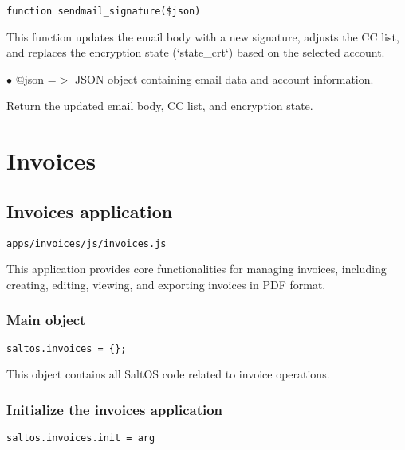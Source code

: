 \documentclass[a4paper]{article}
\begin{document}
\begin{lstlisting}
function sendmail_signature($json)
\end{lstlisting}

This function updates the email body with a new signature, adjusts the CC list,
and replaces the encryption state (`state\_crt`) based on the selected account.

\begin{compactitem}
\item[\color{myblue}$\bullet$] @json =$>$ JSON object containing email data and account information.
\end{compactitem}

Return the updated email body, CC list, and encryption state.


\hypertarget{toc139}{}
\section{Invoices}

\hypertarget{toc140}{}
\subsection{Invoices application}

\begin{lstlisting}
apps/invoices/js/invoices.js
\end{lstlisting}

This application provides core functionalities for managing invoices, including creating,
editing, viewing, and exporting invoices in PDF format.

\hypertarget{toc141}{}
\subsubsection{Main object}

\begin{lstlisting}
saltos.invoices = {};
\end{lstlisting}

This object contains all SaltOS code related to invoice operations.

\hypertarget{toc142}{}
\subsubsection{Initialize the invoices application}

\begin{lstlisting}
saltos.invoices.init = arg
\end{lstlisting}
\end{document}
